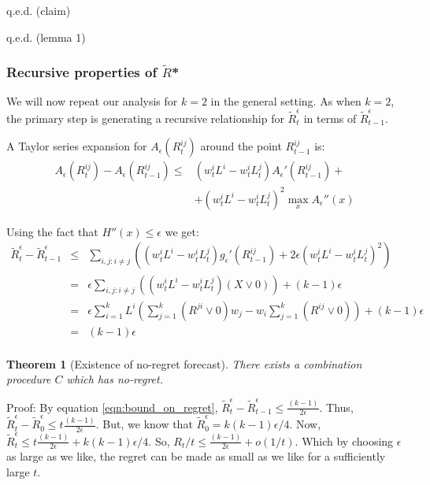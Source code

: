 \documentclass{book}
\newtheorem{theorem}{Theorem}[chapter]
\begin{document}
\hfill q.e.d. (claim)

\hfill q.e.d. (lemma 1)
           \subsubsection[Properties*]{Recursive properties of $\tilde{R}$*}
%       
We will now repeat our analysis for $k=2$ in the general setting.  As
when $k=2$, the primary step is generating a recursive relationship
for $\tilde{R}^\epsilon_t$ in terms of $\tilde{R}^\epsilon_{t-1}$. 

A Taylor series expansion for $ A_\epsilon(R^{ij}_t)$ around the
point $R^{ij}_{t-1}$ is:
\begin{eqnarray*}
  A_\epsilon(R^{ij}_t) - A_\epsilon(R^{ij}_{t-1}) \le
   & (w^i_t L^i - w^i_t L^j_t)   A_\epsilon'(R^{ij}_{t-1}) +
  \\
   & +(w^i_t L^i - w^i_t L^j_t)^2  \max_x A_\epsilon''(x)
\end{eqnarray*}

 Using the fact that $H''(x) \le \epsilon$ we get:
\begin{eqnarray}
 \tilde{R}^\epsilon_t -\tilde{R}^\epsilon_{t-1} &\le& \sum_{i,j:i \ne j}
 \left( (w^i_t L^i - w^i_t L^j_t) g_\epsilon'(R^{ij}_{t-1}) +
 2\epsilon(w^i_t L^i - w^i_t L^j_t)^2 \right) \nonumber \\
 &=& \epsilon \sum_{i,j:i \ne j}
 \left( (w^i_t L^i - w^i_t L^j_t) (X \vee 0)\right) + (k-1)\epsilon
 \nonumber \\
 &=& \epsilon \sum_{i=1}^{k} L^i \left( \sum_{j=1}^k \left(R^{ji} \vee
 0 \right) w_j - w_i \sum_{j=1}^k\left(  R^{ij} \vee 0 \right) \right) +
 (k-1)\epsilon \nonumber \\ 
 &=& (k-1)\epsilon \label{eqn:bound_on_regret}\\ 
\end{eqnarray}


\begin{theorem}[Existence of no-regret forecast]
  There exists a combination procedure $C$ which has no-regret.
\end{theorem}

Proof: By equation \ref{eqn:bound_on_regret}, $\tilde{R}^\epsilon_t
-\tilde{R}^\epsilon_{t-1} \le \displaystyle \frac{(k-1)}{2\epsilon}$.
Thus, $\tilde{R}^\epsilon_t - \tilde{R}^\epsilon_{0} \le t
\frac{(k-1)}{2\epsilon}$.  But, we know that $\tilde{R}^\epsilon_{0} =
k(k-1)\epsilon/4$.  Now, $\tilde{R}^\epsilon_{t} \le t
\frac{(k-1)}{2\epsilon} + k(k-1)\epsilon/4$.  So, $R_t/t \le
\frac{(k-1)}{2\epsilon} + o(1/t)$.  Which by choosing $\epsilon$ as
large as we like, the regret can be made as small as we like for a
sufficiently large $t$.
\end{document}
